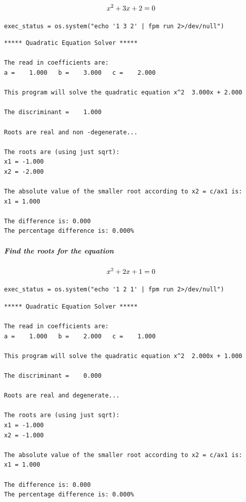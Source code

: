 \begin{equation}
\Large x^2 + 3x + 2 = 0
\end{equation}

\begin{verbatim}
exec_status = os.system("echo '1 3 2' | fpm run 2>/dev/null")
\end{verbatim}

\begin{verbatim}
***** Quadratic Equation Solver *****

The read in coefficients are:
a =    1.000   b =    3.000   c =    2.000

This program will solve the quadratic equation x^2  3.000x + 2.000

The discriminant =    1.000

Roots are real and non -degenerate...

The roots are (using just sqrt):
x1 = -1.000
x2 = -2.000

The absolute value of the smaller root according to x2 = c/ax1 is:
x1 = 1.000

The difference is: 0.000
The percentage difference is: 0.000%
\end{verbatim}

\subparagraph{Find the roots for the equation \newline
}

\begin{equation}
\Large x^2 + 2x + 1 = 0
\end{equation}

\begin{verbatim}
exec_status = os.system("echo '1 2 1' | fpm run 2>/dev/null")
\end{verbatim}

\begin{verbatim}
***** Quadratic Equation Solver *****

The read in coefficients are:
a =    1.000   b =    2.000   c =    1.000

This program will solve the quadratic equation x^2  2.000x + 1.000

The discriminant =    0.000

Roots are real and degenerate...

The roots are (using just sqrt):
x1 = -1.000
x2 = -1.000

The absolute value of the smaller root according to x2 = c/ax1 is:
x1 = 1.000

The difference is: 0.000
The percentage difference is: 0.000%
\end{verbatim}

